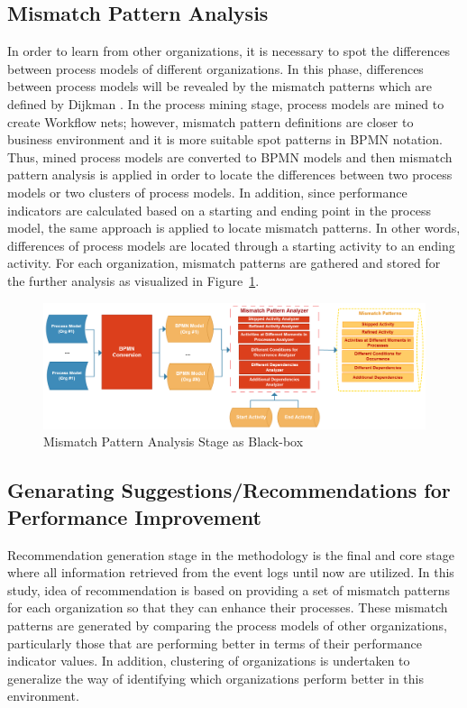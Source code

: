\subsection{Mismatch Pattern Analysis}
\label{subsec:mismatch-pattern-analysis}
In order to learn from other organizations, it is necessary to spot the differences between process models of different organizations. In this phase, differences between process models will be revealed by the mismatch patterns which are defined by Dijkman \cite{dijkman2007mismatch}. In the process mining stage, process models are mined to create Workflow nets; however, mismatch pattern definitions are closer to business environment and it is more suitable spot patterns in BPMN notation. Thus, mined process models are converted to BPMN models and then mismatch pattern analysis is applied in order to locate the differences between two process models or two clusters of process models. In addition, since performance indicators are calculated based on a starting and ending point in the process model, the same approach is applied to locate mismatch patterns. In other words, differences of process models are located through a starting activity to an ending activity. For each organization, mismatch patterns are gathered and stored for the further analysis as visualized in Figure~\ref{fig:mismatch-pattern-analysis-blackbox}.
\begin{figure}
  \centering
  \includegraphics[width=\textwidth]{4_methodology/mismatch-pattern-analysis-blackbox}
  \caption{Mismatch Pattern Analysis Stage as Black-box}
  \label{fig:mismatch-pattern-analysis-blackbox}
\end{figure}

\subsection{Genarating Suggestions/Recommendations for Performance Improvement}
\label{subsec:recommendation-generation}
Recommendation generation stage in the methodology is the final and core stage where all information retrieved from the event logs until now are utilized. In this study, idea of recommendation is based on providing a set of mismatch patterns for each organization so that they can enhance their processes. These mismatch patterns are generated by comparing the process models of other organizations, particularly those that are performing better in terms of their performance indicator values. In addition, clustering of organizations is undertaken to generalize the way of identifying which organizations perform better in this environment.

